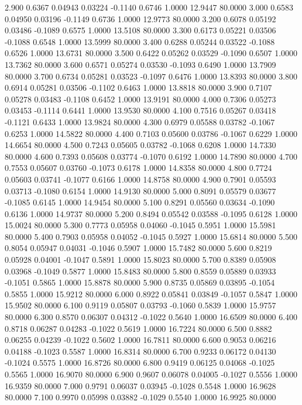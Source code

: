    2.900   0.6367   0.04943   0.03224  -0.1140   0.6746   1.0000  12.9447  80.0000
   3.000   0.6583   0.04950   0.03196  -0.1149   0.6736   1.0000  12.9773  80.0000
   3.200   0.6078   0.05192   0.03486  -0.1089   0.6575   1.0000  13.5108  80.0000
   3.300   0.6173   0.05221   0.03506  -0.1088   0.6548   1.0000  13.5999  80.0000
   3.400   0.6288   0.05244   0.03522  -0.1088   0.6526   1.0000  13.6731  80.0000
   3.500   0.6422   0.05262   0.03529  -0.1090   0.6507   1.0000  13.7362  80.0000
   3.600   0.6571   0.05274   0.03530  -0.1093   0.6490   1.0000  13.7909  80.0000
   3.700   0.6734   0.05281   0.03523  -0.1097   0.6476   1.0000  13.8393  80.0000
   3.800   0.6914   0.05281   0.03506  -0.1102   0.6463   1.0000  13.8818  80.0000
   3.900   0.7107   0.05278   0.03483  -0.1108   0.6452   1.0000  13.9191  80.0000
   4.000   0.7306   0.05273   0.03453  -0.1114   0.6441   1.0000  13.9530  80.0000
   4.100   0.7516   0.05267   0.03418  -0.1121   0.6433   1.0000  13.9824  80.0000
   4.300   0.6979   0.05588   0.03782  -0.1067   0.6253   1.0000  14.5822  80.0000
   4.400   0.7103   0.05600   0.03786  -0.1067   0.6229   1.0000  14.6654  80.0000
   4.500   0.7243   0.05605   0.03782  -0.1068   0.6208   1.0000  14.7330  80.0000
   4.600   0.7393   0.05608   0.03774  -0.1070   0.6192   1.0000  14.7890  80.0000
   4.700   0.7553   0.05607   0.03760  -0.1073   0.6178   1.0000  14.8358  80.0000
   4.800   0.7724   0.05603   0.03741  -0.1077   0.6166   1.0000  14.8758  80.0000
   4.900   0.7901   0.05593   0.03713  -0.1080   0.6154   1.0000  14.9130  80.0000
   5.000   0.8091   0.05579   0.03677  -0.1085   0.6145   1.0000  14.9454  80.0000
   5.100   0.8291   0.05560   0.03634  -0.1090   0.6136   1.0000  14.9737  80.0000
   5.200   0.8494   0.05542   0.03588  -0.1095   0.6128   1.0000  15.0024  80.0000
   5.300   0.7773   0.05958   0.04060  -0.1045   0.5951   1.0000  15.5981  80.0000
   5.400   0.7903   0.05958   0.04052  -0.1045   0.5927   1.0000  15.6814  80.0000
   5.500   0.8054   0.05947   0.04031  -0.1046   0.5907   1.0000  15.7482  80.0000
   5.600   0.8219   0.05928   0.04001  -0.1047   0.5891   1.0000  15.8023  80.0000
   5.700   0.8389   0.05908   0.03968  -0.1049   0.5877   1.0000  15.8483  80.0000
   5.800   0.8559   0.05889   0.03933  -0.1051   0.5865   1.0000  15.8878  80.0000
   5.900   0.8735   0.05869   0.03895  -0.1054   0.5855   1.0000  15.9212  80.0000
   6.000   0.8922   0.05841   0.03849  -0.1057   0.5847   1.0000  15.9502  80.0000
   6.100   0.9119   0.05807   0.03793  -0.1060   0.5839   1.0000  15.9757  80.0000
   6.300   0.8570   0.06307   0.04312  -0.1022   0.5640   1.0000  16.6509  80.0000
   6.400   0.8718   0.06287   0.04283  -0.1022   0.5619   1.0000  16.7224  80.0000
   6.500   0.8882   0.06255   0.04239  -0.1022   0.5602   1.0000  16.7811  80.0000
   6.600   0.9053   0.06216   0.04188  -0.1023   0.5587   1.0000  16.8314  80.0000
   6.700   0.9233   0.06172   0.04130  -0.1024   0.5575   1.0000  16.8726  80.0000
   6.800   0.9419   0.06125   0.04068  -0.1025   0.5565   1.0000  16.9070  80.0000
   6.900   0.9607   0.06078   0.04005  -0.1027   0.5556   1.0000  16.9359  80.0000
   7.000   0.9791   0.06037   0.03945  -0.1028   0.5548   1.0000  16.9628  80.0000
   7.100   0.9970   0.05998   0.03882  -0.1029   0.5540   1.0000  16.9925  80.0000

